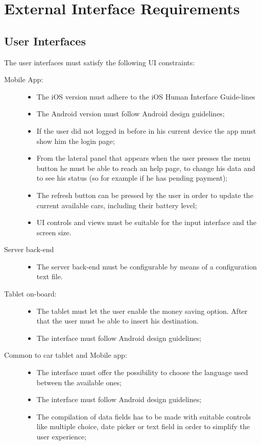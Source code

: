 \section{External Interface Requirements}

\subsection{User Interfaces}
The user interfaces must satisfy the following UI constraints:
\begin{description}
\item[Mobile App:]
	\begin{itemize}
	\item The iOS version must adhere to the iOS Human Interface Guide-lines
	\item The Android version must follow Android design guidelines;
	\item If the user did not logged in before in his current device the app must show him the login page;
	\item From the lateral panel that appears when the user presses the menu button he must be able to reach an help page, to change his data and to see his status (so for example if he has pending payment);
	\item The refresh button can be pressed by the user in order to update the current available cars, including their battery level;
	\item UI controls and views must be suitable for the input interface and the screen size.
	\end{itemize}
\item[Server back-end]
	\begin{itemize}
	\item The server back-end must be configurable by means of a configuration text file.
	\end{itemize}
\item[Tablet on-board:]
	\begin{itemize}
	\item The tablet must let the user enable the money saving option. After that the user must be able to insert his destination.
	\item The interface must follow Android design guidelines;
	\end{itemize}
\item[Common to car tablet and Mobile app:]
\begin{itemize}
	\item The interface must offer the possibility to choose the language used between the available ones;
	\item The interface must follow Android design guidelines;
	\item The compilation of data fields has to be made with suitable controls like multiple choice, date picker or text field in order to simplify the user experience;
	\end{itemize}
\end{description}

